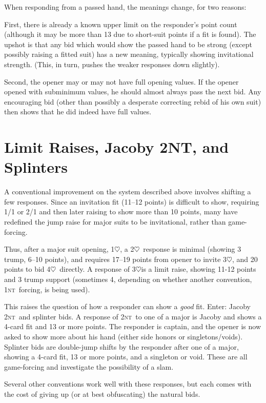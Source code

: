 \documentclass[11pt]{article}
\def\H{$\heartsuit$}
\def\NT{\textsc{nt}}
\begin{document}
When responding from a passed hand, the meanings change, for two reasons:

First, there is already a known upper limit on the responder's point count
(although it may be more than 13 due to short-suit points if a fit is 
found).  The upshot is that any bid which would show the passed hand to be
strong (except possibly raising a fitted suit) has a new meaning, typically
showing invitational strength.  (This, in turn, pushes the weaker responses
down slightly).

Second, the opener may or may not have full opening values.  If the
opener opened with subminimum values, he should almost always pass the
next bid.  Any encouraging bid (other than possibly a desperate
correcting rebid of his own suit) then shows that he did indeed have
full values.

\section{Limit Raises, Jacoby 2NT, and Splinters}

A conventional improvement on the system described above involves
shifting a few responses.  Since an invitation fit (11--12 points)
is difficult to show, requiring 1/1 or 2/1 and then later raising
to show more than 10 points, many have redefined the jump raise for
major suits to be invitational, rather than game-forcing.

Thus, after a major suit opening, 1\H, a 2\H\ response is minimal
(showing 3 trump, 6--10 points), and requires 17--19 points from opener
to invite 3\H, and 20 points to bid 4\H\ directly.  A response of
3\H is a limit raise, showing 11-12 points and 3 trump support
(sometimes 4, depending on whether another convention, 1\NT\ forcing,
is being used).

This raises the question of how a responder can show a \emph{good} fit.
Enter: Jacoby 2\NT\ and splinter bids.  A response of 2\NT\ to one
of a major is Jacoby and shows a 4-card fit and 13 or more points.
The responder is captain, and the opener is now asked to show more
about his hand (either side honors or singletons/voids).  Splinter
bids are double-jump shifts by the responder after one of a major, 
showing a 4-card fit, 13 or more points, and a singleton or void.
These are all game-forcing and investigate the possibility of a slam.

Several other conventions work well with these responses, but each
comes with the cost of giving up (or at best obfuscating) the
natural bids.
\end{document}
